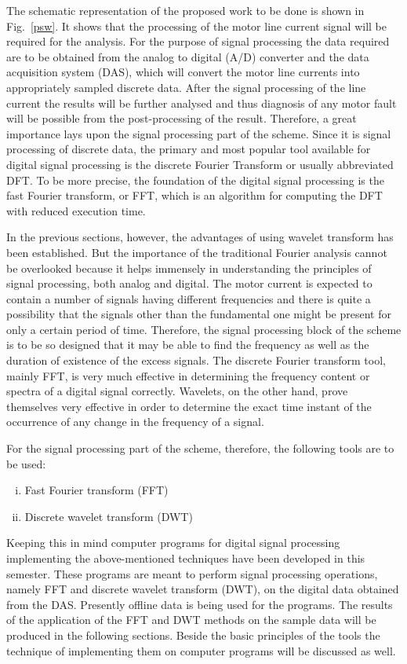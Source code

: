 \documentclass[a4paper,11pt]{article}
\begin{document}
The schematic representation of the proposed work to be done is shown in Fig.~\ref{psw}. It shows that the processing of the motor line current signal will be required for the analysis. For the purpose of signal processing the data required are to be obtained from the analog to digital (A/D) converter and the data acquisition system (DAS), which will convert the motor line currents into appropriately sampled discrete data. After the signal processing of the line current the results will be further analysed and thus diagnosis of any motor fault will be possible from the post-processing of the result. Therefore, a great importance lays upon the signal processing part of the scheme. Since it is signal processing of discrete data, the primary and most popular tool available for digital signal processing is the discrete Fourier Transform or usually abbreviated DFT. To be more precise, the foundation of the digital signal processing is the fast Fourier transform, or FFT, which is an algorithm for computing the DFT with reduced execution time. 

In the previous sections, however, the advantages of using wavelet transform has been established. But the importance of the traditional Fourier analysis cannot be overlooked because it helps immensely in understanding the principles of signal processing, both analog and digital. The motor current is expected to contain a number of signals having different frequencies and there is quite a possibility that the signals other than the fundamental one might be present for only a certain period of time. Therefore, the signal processing block of the scheme is to be so designed that it may be able to find the frequency as well as the duration of existence of the excess signals. The discrete Fourier transform tool, mainly FFT, is very much effective in determining the frequency content or spectra of a digital signal correctly. Wavelets, on the other hand, prove themselves very effective in order to determine the exact time instant of the occurrence of any change in the frequency of a signal.

For the signal processing part of the scheme, therefore, the following tools are to be used:
\begin{enumerate}[(i)]
\item Fast Fourier transform (FFT)
\item Discrete wavelet transform (DWT)
\end{enumerate}

Keeping this in mind computer programs for digital signal processing implementing the above-mentioned techniques have been developed in this semester. These programs are meant to perform signal processing operations, namely FFT and discrete wavelet transform (DWT), on the digital data obtained from the DAS. Presently offline data is being used for the programs. The results of the application of the FFT and DWT methods on the sample data will be produced in the following sections. Beside the basic principles of the tools the technique of implementing them on computer programs will be discussed as well.
\end{document}
